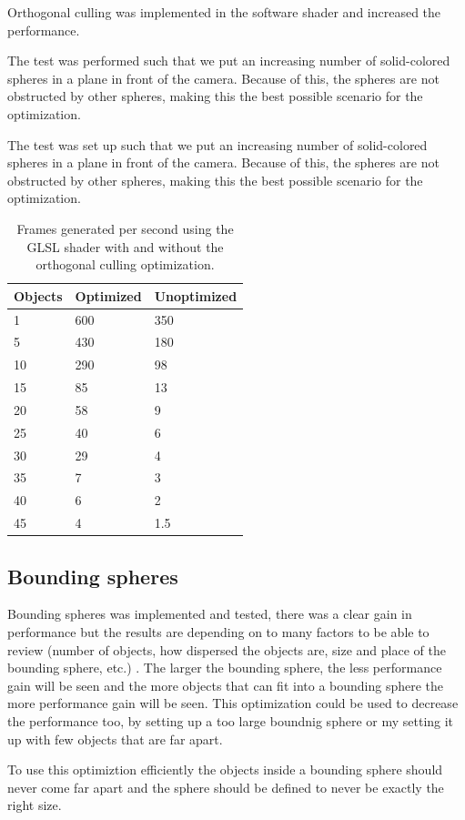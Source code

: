 			Orthogonal culling was implemented in the software shader and
			increased the performance.

			The test was performed such that we put an increasing number of
			solid-colored spheres in a plane in front of the camera. Because of
			this, the spheres are not obstructed by other spheres, making this
			the best possible scenario for the optimization.

			The test was set up such that we put an increasing number of
			solid-colored spheres in a plane in front of the camera. Because of
			this, the spheres are not obstructed by other spheres, making this
			the best possible scenario for the optimization.

			\begin{table}
			\centering
			\begin{tabular}{lll}
				\hline
				Objects & Optimized & Unoptimized \\ 
				\hline
				1       & 600       & 350         \\ 
				5       & 430       & 180         \\			
				10      & 290       & 98          \\
				15      & 85        & 13          \\
				20      & 58        & 9           \\
				25      & 40        & 6           \\
				30      & 29        & 4           \\
				35      & 7         & 3           \\
				40      & 6         & 2           \\
				45      & 4         & 1.5         \\
				\hline
			\end{tabular}
			\caption{Frames generated per second using the GLSL shader with and
				without the orthogonal culling optimization.}
			\end{table}

		\subsection{Bounding spheres}

			Bounding spheres was implemented and tested, there was a clear
			gain in performance but the results are depending on to many 
			factors to be able to review (number of objects, how dispersed the objects are, 
			size and place of the bounding sphere, etc.) . The larger the bounding sphere, the 
			less performance gain will be seen and the more objects that can 
			fit into a bounding sphere the more performance gain will be seen.
			This optimization could be used to decrease the performance too, by
			setting up a too large boundnig sphere or my setting it up with few
			objects that are far apart.

			To use this optimiztion efficiently the objects inside a bounding 
			sphere should never come far apart and the sphere should be defined
			to never be exactly the right size. 
